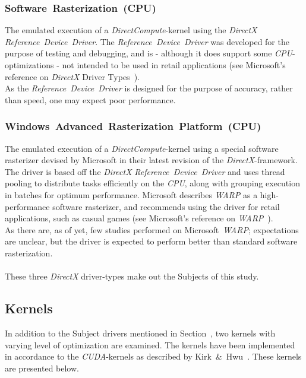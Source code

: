 \documentclass[a4paper,twocolumn,10pt]{article}
\begin{document}
\subsubsection{Software~Rasterization~(CPU)}
The emulated execution of a \textit{DirectCompute}-kernel using the \textit{DirectX} \textit{Reference~Device~Driver}. The \textit{Reference~Device~Driver} was developed for the purpose of testing and debugging, and is - although it does support some \textit{CPU}-optimizations - not intended to be used in retail applications (see Microsoft's reference on \textit{DirectX} Driver Types~).\\
As the \textit{Reference~Device~Driver} is designed for the purpose of accuracy, rather than speed, one may expect poor performance.

\subsubsection{Windows~Advanced~Rasterization~Platform~(CPU)}
The emulated execution of a \textit{DirectCompute}-kernel using a special software rasterizer devised by Microsoft in their latest revision of the \textit{DirectX}-framework. The driver is based off the \textit{DirectX} \textit{Reference~Device~Driver} and uses thread pooling to distribute tasks efficiently on the \textit{CPU}, along with grouping execution in batches for optimum performance. Microsoft describes \textit{WARP} as a high-performance software rasterizer, and recommends using the driver for retail applications, such as casual games (see Microsoft's reference on \textit{WARP}~).\\
As there are, as of yet, few studies performed on Microsoft~\textit{WARP}; expectations are unclear, but the driver is expected to perform better than standard software rasterization.\\
\\
These three \textit{DirectX} driver-types make out the Subjects of this study.

\subsection{Kernels}
\label{sec:contribution:kernels}
In addition to the Subject drivers mentioned in Section~, two kernels with varying level of optimization are examined. The kernels have been implemented in accordance to the \textit{CUDA}-kernels as described by Kirk~\&~Hwu~\cite[p.~67, p.~87]{Kirk:2010:PMP:1841511}. These kernels are presented below.
\end{document}
